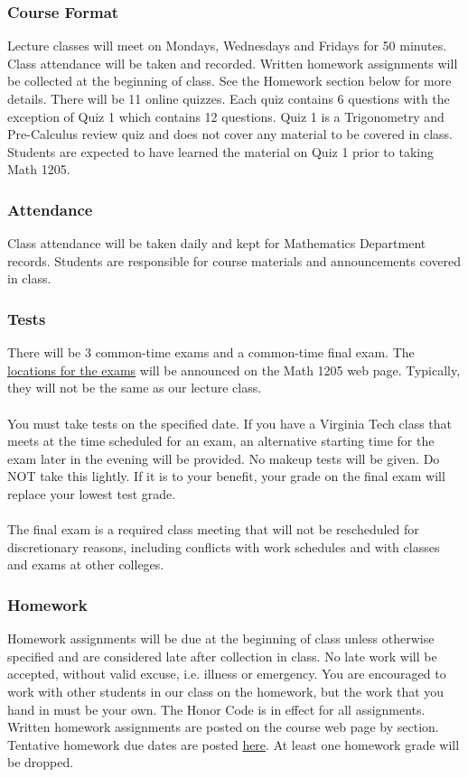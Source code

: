 \documentclass{article}
\begin{document}
			\subsubsection*{Course Format} 
			Lecture classes will meet on Mondays, Wednesdays and Fridays for 50
			minutes.  Class attendance will be taken and recorded. Written homework
			assignments will be collected at the beginning of class. See the
			Homework section below for more details. There will be 11 online
			quizzes. Each quiz contains 6 questions with the exception of Quiz 1
			which contains 12 questions.  Quiz 1 is a Trigonometry and Pre-Calculus
			review quiz and does not cover any material to be covered in class.
			Students are expected to have learned the material on Quiz 1 prior to
			taking Math 1205.
		
			\subsubsection*{Attendance} 
			Class attendance will be taken daily and kept for Mathematics Department
			records. Students are responsible for course materials and announcements
			covered in class.

			\subsubsection*{Tests} 
			There will be 3 common-time exams and a common-time final exam. The \href{http://www.emporium.vt.edu/math1205/resources/testinfo}{locations
			for the exams} will be announced on the Math 1205 web page.
			Typically, they will not be the same as our lecture class. \\ \\
			You must take tests on the specified date. If you have a Virginia Tech
			class that meets at the time scheduled for an exam, an alternative
			starting time for the exam later in the evening will be provided.  No
			makeup tests will be given.  Do NOT take this lightly. If it is to your
			benefit, your grade on the final exam will replace your lowest test
			grade. \\ \\
			The final exam is a required class meeting that will not be rescheduled
			for discretionary reasons, including conflicts with work schedules and
			with classes and exams at other colleges. 
			
			\subsubsection*{Homework}
			Homework assignments will be due at the beginning of class unless
			otherwise specified and are considered late after collection in class. No
			late work will be accepted, without valid excuse, i.e. illness or
			emergency. You are encouraged to work with other students in our class on
			the homework, but the work that you hand in must be your own. The Honor
			Code is in effect for all assignments. Written homework assignments are
			posted on the course web page by section. Tentative homework due dates are
			posted \href{http://www.math.vt.edu/people/erichlf/1205HWS11.html}{here}.
			At least one homework grade will be dropped. 
			
\end{document}
